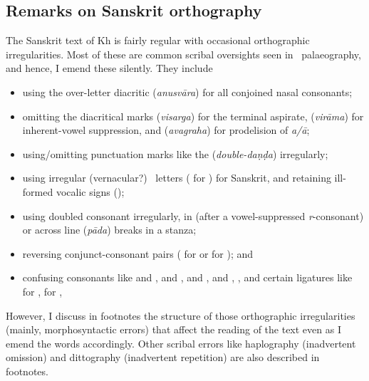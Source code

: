 \subsection{Remarks on Sanskrit orthography}\label{sanskrit_orthography} 
The Sanskrit text of Kh is fairly regular with occasional orthographic irregularities. Most of these are common scribal oversights seen in \Nagari\ palaeography, and hence, I emend these silently. They include 
\begin{itemize}[topsep=0pt]
    \item using the over-letter diacritic  (\textit{anusvāra}) for all conjoined nasal consonants;
    \item omitting the diacritical marks  (\textit{visarga}) for the terminal aspirate,  (\textit{virāma}) for inherent-vowel suppression, and  (\textit{avagraha}) for prodelision of \textit{a/ā};
    \item using/omitting punctuation marks like the \tsans{||} (\textit{double-daṇḍa}) irregularly;
    \item using irregular (vernacular?) \Nagari\ letters ( for ) for Sanskrit, and retaining ill-formed vocalic signs (\eg {});
    \item using doubled consonant irregularly, \eg  {} in   (after a vowel-suppressed \textit{r}-consonant) or across line (\textit{pāda}) breaks in a stanza;
    \item reversing conjunct-consonant pairs (\eg {} for  or  for ); and
    \item confusing consonants like  and ,  and ,  and ,  and , \etcp, and certain ligatures like  for ,  for , \etc
\end{itemize}

However, I discuss in footnotes the structure of those orthographic irregularities (mainly, morphosyntactic errors) that affect the reading of the text even as I emend the words accordingly. Other scribal errors like haplography (inadvertent omission) and dittography (inadvertent repetition) are also described in footnotes. 

